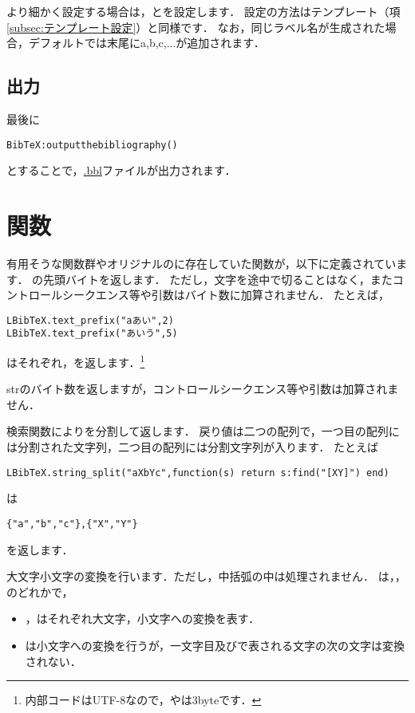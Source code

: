 \documentclass[a4paper]{ltjsarticle}
\begin{document}
より細かく設定する場合は，とを設定します．
設定の方法はテンプレート（項\ref{subsec:テンプレート設定}）と同様です．
なお，同じラベル名が生成された場合，デフォルトでは末尾にa,b,c,...が追加されます．

\subsection{出力}
最後に
\begin{lstlisting}
BibTeX:outputthebibliography()
\end{lstlisting}
とすることで，\url{.bbl}ファイルが出力されます．

\section{関数}\label{sec:関数}
有用そうな関数群やオリジナルの\BibTeX に存在していた関数が，以下に定義されています．
の先頭バイトを返します．
ただし，文字を途中で切ることはなく，またコントロールシークエンス等や引数はバイト数に加算されません．
たとえば，
\begin{lstlisting}
LBibTeX.text_prefix("aあい",2)
LBibTeX.text_prefix("あいう",5)
\end{lstlisting}
はそれぞれ，を返します．\footnote{内部コードはUTF-8なので，やは3byteです．}

strのバイト数を返しますが，コントロールシークエンス等や引数は加算されません．

検索関数によりを分割して返します．
戻り値は二つの配列で，一つ目の配列には分割された文字列，二つ目の配列には分割文字列が入ります．
たとえば
\begin{lstlisting}
LBibTeX.string_split("aXbYc",function(s) return s:find("[XY]") end)
\end{lstlisting}
は
\begin{lstlisting}
{"a","b","c"},{"X","Y"}
\end{lstlisting}
を返します．


大文字小文字の変換を行います．ただし，中括弧の中は処理されません．
は，，のどれかで，
\begin{itemize}
\item {}，はそれぞれ大文字，小文字への変換を表す．
\item {}は小文字への変換を行うが，一文字目及び\luastring{: *}で表される文字の次の文字は変換されない．
\end{itemize}
\end{document}
